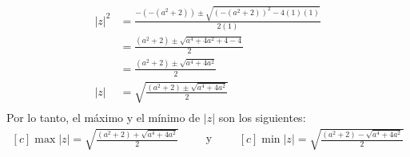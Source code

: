 \begin{problema}
\begin{sol}
        \begin{align*}
            |z|^2 &= \frac{-(-(a^2+2))\pm \sqrt{(-(a^2+2))^2-4(1)(1)}}{2(1)}\\
                  &=\frac{(a^2+2)\pm \sqrt{a^4+4a^2+4-4}}{2}\\
                  &=\frac{(a^2+2)\pm \sqrt{a^4+4a^2}}{2}\\
            |z|   &=  \sqrt{\frac{(a^2+2)\pm \sqrt{a^4+4a^2}}{2}}\\
        \end{align*}
        Por lo tanto, el máximo y el mínimo de $|z|$ son los siguientes: 
        \begin{equation*}
            \begin{aligned}[c]
                \max|z| = \sqrt{\frac{(a^2+2)+ \sqrt{a^4+4a^2}}{2}}
            \end{aligned}
            \qquad\text{y}\qquad
            \begin{aligned}[c]
                \min|z| = \sqrt{\frac{(a^2+2)- \sqrt{a^4+4a^2}}{2}}
            \end{aligned}
            \end{equation*}
    \end{sol}
\end{problema}

